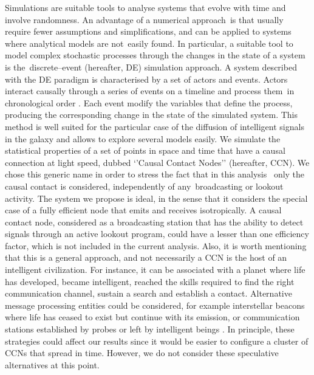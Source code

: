 \documentclass[crop]{CSLB}
\newcommand{\ceti}{CCN}
\newcommand{\cetis}{CCNs}
\begin{document}
Simulations are suitable tools to analyse systems that evolve with time and involve randomness.
%
An advantage of a numerical approach is that usually require fewer assumptions and simplifications, and can be applied to systems where analytical models are not easily found.
%
In particular, a suitable tool to model complex stochastic processes through the changes in the state of a system is the discrete--event (hereafter, DE) simulation approach.
%
A system described with the DE paradigm is characterised by a set of actors and events.
%
Actors interact causally through a series of events on a timeline and process them in chronological order \citep{ptolemaeus_system_2014, chung_simulation_2003, ross_simulation_2012}.
%
Each event modify the variables that define the process, producing the corresponding change in the state of the simulated system.
%
This method is well suited for the particular case of the diffusion of intelligent signals in the galaxy and allows to explore several models easily.
%
We simulate the statistical properties of a set of points in space and time that have a causal connection at light speed, dubbed ‘’Causal Contact Nodes’’ (hereafter, \ceti{}).
%
We chose this generic name in order to stress the fact that in this analysis 
only the causal contact is considered, independently of any broadcasting or lookout activity.
%
The system we propose is ideal, in the sense that it considers the special case of a fully efficient node that emits and receives isotropically.
%
A causal contact node, considered as a broadcasting station that has the ability to detect signals through an active lookout program, could have a lesser than one efficiency factor, which is not included in the current analysis.
%
Also, it is worth mentioning that this is a general approach, and not necessarily a \ceti{} is the host of an intelligent civilization.
%
For instance, it can be associated with a planet where life has developed, became intelligent, reached the skills required to find the right communication channel, sustain a search and establish a contact.
%
Alternative message processing entities could be considered, for example interstellar beacons where life has ceased to exist but continue with its emission, or communication stations established by probes or left by intelligent beings \citep[see, e.g., ][]{peters_outer_2018, barlow_galactic_2013}.
%
In principle, these strategies could affect our results since it would be easier to configure a cluster of \cetis{} that spread in time.
%
However, we do not consider these speculative alternatives at this point.
\end{document}
